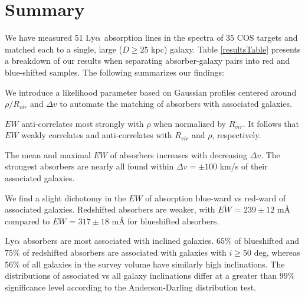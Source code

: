 \documentclass[iop]{emulateapj-rtx4}
\begin{document}
\section{Summary}


We have measured 51 $\rm Ly\alpha$ absorption lines in the spectra of 35 COS targets and matched each to a single, large ($D\geq 25$ kpc) galaxy. Table \ref{resultsTable} presents a breakdown of our results when separating absorber-galaxy pairs into red and blue-shifted samples. The following summarizes our findings:

\indent \textbullet \indent We introduce a likelihood parameter based on Gaussian profiles centered around $\rho / R_{vir}$ and $\Delta v$ to automate the matching of absorbers with associated galaxies. 


\indent \textbullet \indent $EW$ anti-correlates most strongly with $\rho$ when normalized by $R_{vir}$. It follows that $EW$ weakly correlates and anti-correlates with $R_{vir}$ and $\rho$, respectively.

\indent \textbullet \indent The mean and maximal $EW$ of absorbers increases with decreasing $\Delta v$. The strongest absorbers are nearly all found within $\Delta v = \pm 100$ km/s of their associated galaxies.

\indent \textbullet \indent We find a slight dichotomy in the $EW$ of absorption blue-ward vs red-ward of associated galaxies. Redshifted absorbers are weaker, with $\overline{EW}$ = $239 \pm 12$ $\textrm{m\AA}$ compared to $EW$ = $317 \pm 18$ $\textrm{m\AA}$ for blueshifted absorbers.


\textbullet \indent $\rm Ly\alpha$ absorbers are most associated with inclined galaxies. $65\%$ of blueshifted and $75\%$ of redshifted absorbers are associated with galaxies with $i \geq 50$ deg, whereas $56\%$ of all galaxies in the survey volume have similarly high inclinations. The distributions of associated vs all galaxy inclinations differ at a greater than $99\%$ significance level according to the Anderson-Darling distribution test.
\end{document}
